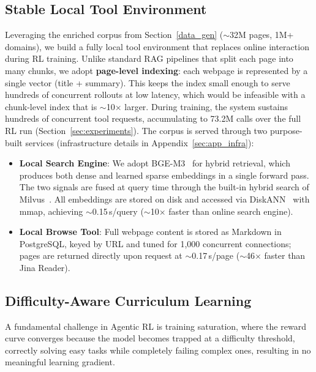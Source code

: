 \documentclass{article} %
\theoremstyle{plain}
\theoremstyle{definition}
\theoremstyle{remark}
\begin{document}
\subsection{Stable Local Tool Environment}

Leveraging the enriched corpus from Section~\ref{data_gen} ($\sim$32M pages, 1M+ domains), we build a fully local tool environment that replaces online interaction during RL training. Unlike standard RAG pipelines that split each page into many chunks, we adopt \textbf{page-level indexing}: each webpage is represented by a single vector (title + summary). This keeps the index small enough to serve hundreds of concurrent rollouts at low latency, which would be infeasible with a chunk-level index that is $\sim$10$\times$ larger. During training, the system sustains hundreds of concurrent tool requests, accumulating to 73.2M calls over the full RL run (Section~\ref{sec:experiments}). The corpus is served through two purpose-built services (infrastructure details in Appendix~\ref{sec:app_infra}):

\begin{itemize}[leftmargin=*,nosep]
    \item \textbf{Local Search Engine}: We adopt BGE-M3~\citep{chen2024bge} for hybrid retrieval, which produces both dense and learned sparse embeddings in a single forward pass. The two signals are fused at query time through the built-in hybrid search of Milvus~\citep{wang2021milvus}. All embeddings are stored on disk and accessed via DiskANN~\citep{jayaram2019diskann} with mmap, achieving $\sim$0.15\,s/query ($\sim$10$\times$ faster than online search engine).
    \item \textbf{Local Browse Tool}: Full webpage content is stored as Markdown in PostgreSQL, keyed by URL and tuned for 1,000 concurrent connections; pages are returned directly upon request at $\sim$0.17\,s/page ($\sim$46$\times$ faster than Jina Reader).
\end{itemize} 


\noindent


\subsection{Difficulty-Aware Curriculum Learning}

A fundamental challenge in Agentic RL is training saturation, where the reward curve converges because the model becomes trapped at a difficulty threshold, correctly solving easy tasks while completely failing complex ones, resulting in no meaningful learning gradient.
\end{document}
